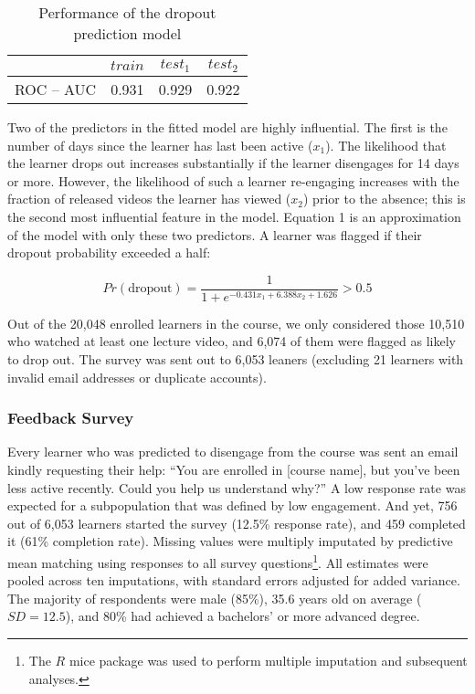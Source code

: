 \documentclass{sigchi}\usepackage[]{graphicx}\usepackage[]{color}
\begin{document}
\begin{table}[h!]
\caption{Performance of the dropout prediction model}
\label{tab:drop_pred_rocs}
\small
\center
\begin{tabular}{lccc}
\toprule
 & $train$ & $test_1$ & $test_2$ \\
\midrule
ROC -- AUC &  0.931 & 0.929 & 0.922  \\
\bottomrule
\end{tabular}
\end{table}

Two of the predictors in the fitted model are highly influential. The first is the number of days since the learner has last been active ($x_{1}$). The likelihood that the learner drops out increases substantially if the learner disengages for 14 days or more. However, the likelihood of such a learner re-engaging increases with the fraction of released videos the learner has viewed ($x_{2}$) prior to the absence; this is the second most influential feature in the model. Equation 1 is an approximation of the model with only these two predictors. A learner was flagged if their dropout probability exceeded a half:

\begin{equation}
Pr(\text{dropout}) = \frac{1}{1+e^{-0.431x_1 + 6.388x_2 + 1.626}} > 0.5
\end{equation}

Out of the 20,048 enrolled learners in the course, we only considered those 10,510 who watched at least one lecture video, and 6,074 of them were flagged as likely to drop out. The survey was sent out to 6,053 leaners (excluding 21 learners with invalid email addresses or duplicate accounts).


\subsubsection{Feedback Survey}

Every learner who was predicted to disengage from the course was sent an email kindly requesting their help: ``You are enrolled in [course name], but you've been less active recently. Could you help us understand why?'' A low response rate was expected for a subpopulation that was defined by low engagement. And yet, 756 out of 6,053 learners started the survey (12.5\% response rate), and 459 completed it (61\% completion rate). Missing values were multiply imputated by predictive mean matching using responses to all survey questions\footnote{The $R$ mice package was used to perform multiple imputation and subsequent analyses.}. All estimates were pooled across ten imputations, with standard errors adjusted for added variance. The majority of respondents were male (85\%), 35.6 years old on average ($SD=12.5$), and 80\% had achieved a bachelors' or more advanced degree.
\end{document}
